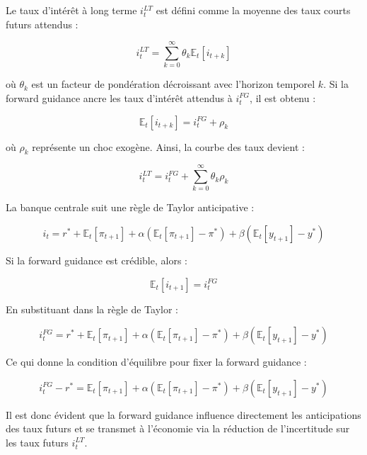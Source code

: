 Le taux d’intérêt à long terme \( i_t^{LT} \) est défini comme la moyenne des taux courts futurs attendus :

\begin{equation}
i_t^{LT} = \sum_{k=0}^{\infty} \theta_k \mathbb{E}_t [i_{t+k}]
\end{equation}

où \( \theta_k \) est un facteur de pondération décroissant avec l’horizon temporel \( k \). Si la forward guidance ancre les taux d'intérêt attendus à \( i_t^{FG} \), il est obtenu :

\begin{equation}
\mathbb{E}_t [i_{t+k}] = i_t^{FG} + \rho_k
\end{equation}

où \( \rho_k \) représente un choc exogène. Ainsi, la courbe des taux devient :

\begin{equation}
i_t^{LT} = i_t^{FG} + \sum_{k=0}^{\infty} \theta_k \rho_k
\end{equation}

La banque centrale suit une règle de Taylor anticipative :

\begin{equation}
i_t = r^* + \mathbb{E}_t [\pi_{t+1}] + \alpha (\mathbb{E}_t [\pi_{t+1}] - \pi^*) + \beta (\mathbb{E}_t [y_{t+1}] - y^*)
\end{equation}

Si la forward guidance est crédible, alors :

\begin{equation}
\mathbb{E}_t [i_{t+1}] = i_t^{FG}
\end{equation}

En substituant dans la règle de Taylor :

\begin{equation}
i_t^{FG} = r^* + \mathbb{E}_t [\pi_{t+1}] + \alpha (\mathbb{E}_t [\pi_{t+1}] - \pi^*) + \beta (\mathbb{E}_t [y_{t+1}] - y^*)
\end{equation}

Ce qui donne la condition d'équilibre pour fixer la forward guidance :

\begin{equation}
i_t^{FG} - r^* = \mathbb{E}_t [\pi_{t+1}] + \alpha (\mathbb{E}_t [\pi_{t+1}] - \pi^*) + \beta (\mathbb{E}_t [y_{t+1}] - y^*)
\end{equation}

Il est donc évident que la forward guidance influence directement les anticipations des taux futurs et se transmet à l'économie via la réduction de l’incertitude sur les taux futurs \( i_t^{LT} \).\\

